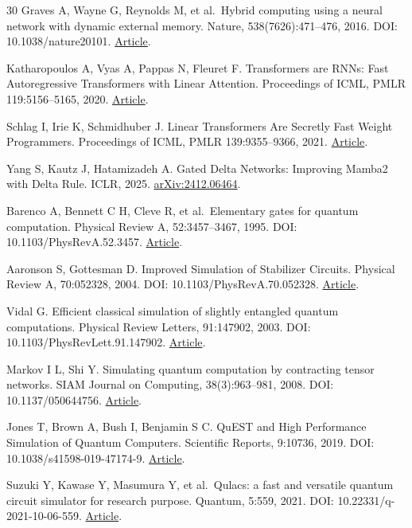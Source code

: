 \documentclass[11pt,a4paper]{article}
\begin{document}
\begin{thebibliography}{30}
Graves A, Wayne G, Reynolds M, et al.~Hybrid computing using a neural network with dynamic external memory. Nature, 538(7626):471--476, 2016. DOI: 10.1038/nature20101. \href{https://www.nature.com/articles/nature20101}{Article}.

Katharopoulos A, Vyas A, Pappas N, Fleuret F. Transformers are RNNs: Fast Autoregressive Transformers with Linear Attention. Proceedings of ICML, PMLR 119:5156--5165, 2020. \href{https://proceedings.mlr.press/v119/katharopoulos20a.html}{Article}.

Schlag I, Irie K, Schmidhuber J. Linear Transformers Are Secretly Fast Weight Programmers. Proceedings of ICML, PMLR 139:9355--9366, 2021. \href{https://proceedings.mlr.press/v139/schlag21a.html}{Article}.

Yang S, Kautz J, Hatamizadeh A. Gated Delta Networks: Improving Mamba2 with Delta Rule. ICLR, 2025. \href{https://arxiv.org/abs/2412.06464}{arXiv:2412.06464}.

Barenco A, Bennett C H, Cleve R, et al.~Elementary gates for quantum computation. Physical Review A, 52:3457--3467, 1995. DOI: 10.1103/PhysRevA.52.3457. \href{https://arxiv.org/abs/quant-ph/9503016}{Article}.

Aaronson S, Gottesman D. Improved Simulation of Stabilizer Circuits. Physical Review A, 70:052328, 2004. DOI: 10.1103/PhysRevA.70.052328. \href{https://arxiv.org/abs/quant-ph/0406196}{Article}.

Vidal G. Efficient classical simulation of slightly entangled quantum computations. Physical Review Letters, 91:147902, 2003. DOI: 10.1103/PhysRevLett.91.147902. \href{https://arxiv.org/abs/quant-ph/0301063}{Article}.

Markov I L, Shi Y. Simulating quantum computation by contracting tensor networks. SIAM Journal on Computing, 38(3):963--981, 2008. DOI: 10.1137/050644756. \href{https://arxiv.org/abs/quant-ph/0511069}{Article}.

Jones T, Brown A, Bush I, Benjamin S C. QuEST and High Performance Simulation of Quantum Computers. Scientific Reports, 9:10736, 2019. DOI: 10.1038/s41598-019-47174-9. \href{https://www.nature.com/articles/s41598-019-47174-9}{Article}.

Suzuki Y, Kawase Y, Masumura Y, et al.~Qulacs: a fast and versatile quantum circuit simulator for research purpose. Quantum, 5:559, 2021. DOI: 10.22331/q-2021-10-06-559. \href{https://quantum-journal.org/papers/q-2021-10-06-559/}{Article}.


\end{thebibliography}
\end{document}
